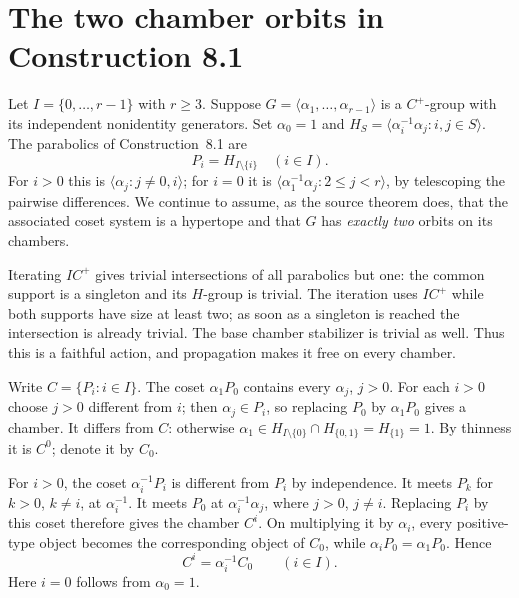 \documentclass[11pt,a4paper]{article}
\newcommand{\gen}[1]{\langle#1\rangle}
\begin{document}
\section{The two chamber orbits in Construction 8.1}

Let $I=\{0,\ldots,r-1\}$ with $r\ge3$.  Suppose
$G=\gen{\alpha_1,\ldots,\alpha_{r-1}}$ is a $C^+$-group with its
independent nonidentity generators.  Set $\alpha_0=1$ and
$H_S=\gen{\alpha_i^{-1}\alpha_j:i,j\in S}$.
The parabolics of Construction~8.1 are
\[
 P_i=H_{I\setminus\{i\}}\quad(i\in I).
\]
For $i>0$ this is $\gen{\alpha_j:j\ne0,i}$; for $i=0$ it is
$\gen{\alpha_1^{-1}\alpha_j:2\le j<r}$, by telescoping the
pairwise differences.  We continue to assume, as the source theorem does,
that the associated coset system is a hypertope and that $G$ has
\emph{exactly two} orbits on its chambers.

Iterating $IC^+$ gives trivial intersections of all parabolics but one:
the common support is a singleton and its $H$-group is trivial.
The iteration uses $IC^+$ while both supports have size at least two;
as soon as a singleton is reached the intersection is already trivial.
The base chamber stabilizer is trivial as well.  Thus this is a faithful
action, and propagation makes it free on every chamber.

Write $C=\{P_i:i\in I\}$.  The coset $\alpha_1P_0$ contains every
$\alpha_j$, $j>0$.  For each $i>0$ choose $j>0$ different from $i$;
then $\alpha_j\in P_i$, so replacing $P_0$ by $\alpha_1P_0$ gives
a chamber.  It differs from $C$: otherwise
$\alpha_1\in H_{I\setminus\{0\}}\cap H_{\{0,1\}}=H_{\{1\}}=1$.
By thinness it is $C^0$; denote it by $C_0$.

For $i>0$, the coset $\alpha_i^{-1}P_i$ is different from $P_i$
by independence.  It meets $P_k$ for $k>0$, $k\ne i$, at
$\alpha_i^{-1}$.  It meets $P_0$ at $\alpha_i^{-1}\alpha_j$,
where $j>0$, $j\ne i$.  Replacing $P_i$ by this coset therefore
gives the chamber $C^i$.  On multiplying it by $\alpha_i$, every
positive-type object becomes the corresponding object of $C_0$, while
$\alpha_iP_0=\alpha_1P_0$.  Hence
\[
                         C^i=\alpha_i^{-1}C_0
                         \qquad(i\in I).
\]
Here $i=0$ follows from $\alpha_0=1$.
\end{document}
